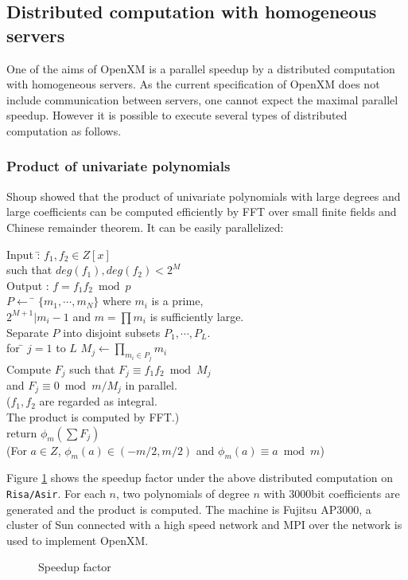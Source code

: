 
\subsection{Distributed computation with homogeneous servers}
\label{section:homog}

One of the aims of OpenXM is a parallel speedup by a distributed computation
with homogeneous servers. As the current specification of OpenXM does
not include communication between servers, one cannot expect
the maximal parallel speedup. However it is possible to execute
several types of distributed computation as follows.

\subsubsection{Product of univariate polynomials}

Shoup \cite{Shoup} showed that the product of univariate polynomials
with large degrees and large coefficients can be computed efficiently
by FFT over small finite fields and Chinese remainder theorem.
It can be easily parallelized:

\begin{tabbing}
Input :\= $f_1, f_2 \in Z[x]$\\
\> such that $deg(f_1), deg(f_2) < 2^M$\\
Output : $f = f_1f_2 \bmod p$\\
$P \leftarrow$ \= $\{m_1,\cdots,m_N\}$ where $m_i$ is a prime, \\
\> $2^{M+1}|m_i-1$ and $m=\prod m_i $ is sufficiently large. \\
Separate $P$ into disjoint subsets $P_1, \cdots, P_L$.\\
for \= $j=1$ to $L$ $M_j \leftarrow \prod_{m_i\in P_j} m_i$\\
Compute $F_j$ such that $F_j \equiv f_1f_2 \bmod M_j$\\
\> and $F_j \equiv 0 \bmod m/M_j$ in parallel.\\
\> ($f_1, f_2$ are regarded as integral.\\
\> The product is computed by FFT.)\\
return $\phi_m(\sum F_j)$\\
(For $a \in Z$, $\phi_m(a) \in (-m/2,m/2)$ and $\phi_m(a)\equiv a \bmod m$)
\end{tabbing}

Figure \ref{speedup}
shows the speedup factor under the above distributed computation
on {\tt Risa/Asir}. For each $n$, two polynomials of degree $n$
with 3000bit coefficients are generated and the product is computed.
The machine is Fujitsu AP3000,
a cluster of Sun connected with a high speed network and MPI over the
network is used to implement OpenXM.
\begin{figure}[htbp]
\epsfxsize=8.5cm
\caption{Speedup factor}
\label{speedup}
\end{figure}

